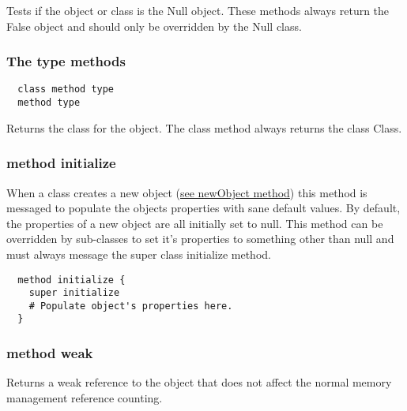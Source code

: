 Tests if the object or class is the Null object. These methods always return
the False object and should only be overridden by the Null class.

\hfill
\subsubsection {The type methods}
\begin{lstlisting}
  class method type
  method type
\end{lstlisting}

Returns the class for the object. The class method always returns the class
Class.

\hfill
\subsubsection {method initialize}
When a class creates a new object
(\hyperref[sec:class_method_newobject]{see newObject method}) this method is
messaged to populate the objects properties with sane default values. By
default, the properties of a new object are all initially set to null. This
method can be overridden by sub-classes to set it's properties to something
other than null and must always message the super class initialize method.

\begin{lstlisting}
  method initialize {
    super initialize
    # Populate object's properties here.
  }
\end{lstlisting}

\subsubsection {method weak}

Returns a weak reference to the object that does not affect the normal memory
management reference counting.
